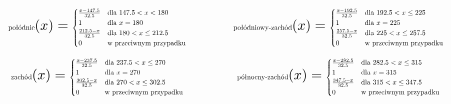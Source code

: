 \documentclass{article}
\begin{document}
\begin{equation*}
\begin{minipage}{0.5\textwidth}
\centering
$\text{\scalebox{0.5}{połódnie}}(x) =
\scalebox{0.5}{$
\begin{cases}
\frac{x - 147.5}{32.5} & \text{dla } 147.5 < x < 180 \\
1 & \text{dla } x = 180 \\
\frac{212.5 - x}{32.5} & \text{dla } 180 < x \leq 212.5 \\
0 & \text{w przeciwnym przypadku}
\end{cases}
$}$
\end{minipage}%
\begin{minipage}{0.5\textwidth}
\centering
$\text{\scalebox{0.5}{połódniowy-zachód}}(x) =
\scalebox{0.5}{$
\begin{cases}
\frac{x - 192.5}{32.5} & \text{dla } 192.5 < x \leq 225 \\
1 & \text{dla } x = 225 \\
\frac{257.5 - x}{32.5} & \text{dla } 225 < x \leq 257.5 \\
0 & \text{w przeciwnym przypadku}
\end{cases}
$}$
\end{minipage}
\end{equation*}
\begin{equation*}
\begin{minipage}{0.5\textwidth}
\centering
$\text{\scalebox{0.5}{zachód}}(x) =
\scalebox{0.5}{$
\begin{cases}
\frac{x - 237.5}{32.5} & \text{dla } 237.5 < x \leq 270 \\
1 & \text{dla } x = 270 \\
\frac{302.5 - x}{32.5} & \text{dla } 270 < x \leq 302.5 \\
0 & \text{w przeciwnym przypadku}
\end{cases}
$}$
\end{minipage}%
\begin{minipage}{0.5\textwidth}
\centering
$\text{\scalebox{0.5}{północny-zachód}}(x) =
\scalebox{0.5}{$
\begin{cases}
\frac{x - 282.5}{32.5} & \text{dla } 282.5 < x \leq 315 \\
1 & \text{dla } x = 315 \\
\frac{347.5 - x}{32.5} & \text{dla } 315 < x \leq 347.5 \\
0 & \text{w przeciwnym przypadku}
\end{cases}
$}$
\end{minipage}
\end{equation*}
\end{document}
